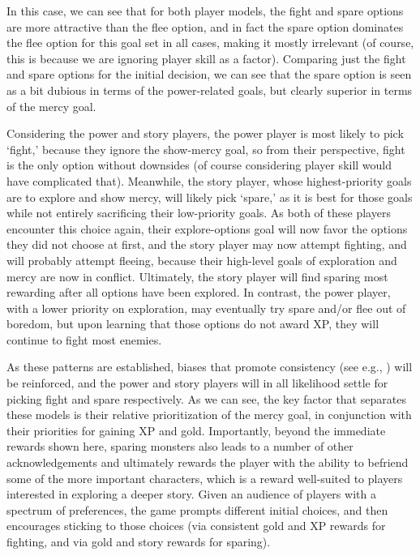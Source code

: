 \documentclass[arts,article,submit,moreauthors,pdftex,10pt,a4paper]{Definitions/mdpi}
\begin{document}
In this case, we can see that for both player models, the fight and spare options are more attractive than the flee option, and in fact the spare option dominates the flee option for this goal set in all cases, making it mostly irrelevant (of course, this is because we are ignoring player skill as a factor).
%
Comparing just the fight and spare options for the initial decision, we can see that the spare option is seen as a bit dubious in terms of the power-related goals, but clearly superior in terms of the mercy goal.


Considering the power and story players, the power player is most likely to pick `fight,' because they ignore the show-mercy goal, so from their perspective, fight is the only option without downsides (of course considering player skill would have complicated that).
%
Meanwhile, the story player, whose highest-priority goals are to explore and show mercy, will likely pick `spare,' as it is best for those goals while not entirely sacrificing their low-priority goals.
%
As both of these players encounter this choice again, their explore-options goal will now favor the options they did not choose at first, and the story player may now attempt fighting, and will probably attempt fleeing, because their high-level goals of exploration and mercy are now in conflict.
%
Ultimately, the story player will find sparing most rewarding after all options have been explored.
%
In contrast, the power player, with a lower priority on exploration, may eventually try spare and/or flee out of boredom, but upon learning that those options do not award XP, they will continue to fight most enemies.


As these patterns are established, biases that promote consistency (see e.g., \cite{brehm1956postdecision,mather2000misremembrance,hall2012lifting}) will be reinforced, and the power and story players will in all likelihood settle for picking fight and spare respectively.
%
As we can see, the key factor that separates these models is their relative prioritization of the mercy goal, in conjunction with their priorities for gaining XP and gold.
%
Importantly, beyond the immediate rewards shown here, sparing monsters also leads to a number of other acknowledgements and ultimately rewards the player with the ability to befriend some of the more important characters, which is a reward well-suited to players interested in exploring a deeper story.
%
Given an audience of players with a spectrum of preferences, the game prompts different initial choices, and then encourages sticking to those choices (via consistent gold and XP rewards for fighting, and via gold and story rewards for sparing).
\end{document}
